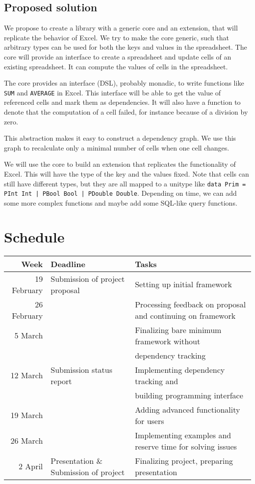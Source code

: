 \documentclass{article}
\begin{document}
	\subsection{Proposed solution}
	We propose to create a library with a generic core and an extension, that will replicate the behavior of Excel. We try to make the core generic, such that arbitrary types can be used for both the keys and values in the spreadsheet. The core will provide an interface to create a spreadsheet and update cells of an existing spreadsheet. It can compute the values of cells in the spreadsheet.
	
	The core provides an interface (DSL), probably monadic, to write functions like \texttt{SUM} and \texttt{AVERAGE} in Excel. This interface will be able to get the value of referenced cells and mark them as dependencies. It will also have a function to denote that the computation of a cell failed, for instance because of a division by zero.
	
	This abstraction makes it easy to construct a dependency graph. We use this graph to recalculate only a minimal number of cells when one cell changes.
	
	We will use the core to build an extension that replicates the functionality of Excel. This will have the type of the key and the values fixed. Note that cells can still have different types, but they are all mapped to a unitype like \texttt{data Prim = PInt Int | PBool Bool | PDouble Double}. Depending on time, we can add some more complex functions and maybe add some SQL-like query functions.
	
	\section{Schedule}
		\begin{tabular}{|r|l|l|} \hline
			Week & Deadline &Tasks \footnotemark  \\ \hline \hline
			19 February & Submission of project proposal & Setting up initial framework\\ \hline
			26 February &  & Processing feedback on proposal and continuing on framework\\ \hline
			5 March & & Finalizing bare minimum framework without \\
			 & & dependency tracking \\ \hline
			12 March & Submission status report & Implementing dependency tracking and \\
			 & & building programming interface\\ \hline
			19 March & & Adding advanced functionality for users\\ \hline
			26 March & & Implementing examples and reserve time for solving issues\\ \hline
			2 April & Presentation \& Submission of project & Finalizing project, preparing presentation\\ \hline
			
		\end{tabular}
\end{document}
